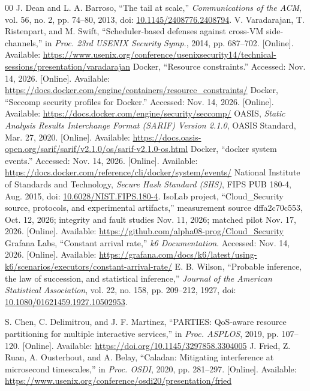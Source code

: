\documentclass[conference,letterpaper]{IEEEtran}
\begin{document}
\begin{thebibliography}{00}
 J. Dean and L. A. Barroso, ``The tail at scale,'' \emph{Communications of the ACM}, vol. 56, no. 2, pp. 74--80, 2013, doi: \href{https://doi.org/10.1145/2408776.2408794}{10.1145/2408776.2408794}.
 V. Varadarajan, T. Ristenpart, and M. Swift, ``Scheduler-based defenses against cross-VM side-channels,'' in \emph{Proc. 23rd USENIX Security Symp.}, 2014, pp. 687--702. [Online]. Available: \url{https://www.usenix.org/conference/usenixsecurity14/technical-sessions/presentation/varadarajan}
 Docker, ``Resource constraints.'' Accessed: Nov. 14, 2026. [Online]. Available: \url{https://docs.docker.com/engine/containers/resource_constraints/}
 Docker, ``Seccomp security profiles for Docker.'' Accessed: Nov. 14, 2026. [Online]. Available: \url{https://docs.docker.com/engine/security/seccomp/}
 OASIS, \emph{Static Analysis Results Interchange Format (SARIF) Version 2.1.0}, OASIS Standard, Mar. 27, 2020. [Online]. Available: \url{https://docs.oasis-open.org/sarif/sarif/v2.1.0/os/sarif-v2.1.0-os.html}
 Docker, ``docker system events.'' Accessed: Nov. 14, 2026. [Online]. Available: \url{https://docs.docker.com/reference/cli/docker/system/events/}
 National Institute of Standards and Technology, \emph{Secure Hash Standard (SHS)}, FIPS PUB 180-4, Aug. 2015, doi: \href{https://doi.org/10.6028/NIST.FIPS.180-4}{10.6028/NIST.FIPS.180-4}.
 IsoLab project, ``Cloud\_Security source, protocols, and experimental artifacts,'' measurement source dffa2c70c553, Oct. 12, 2026; integrity and fault studies Nov. 11, 2026; matched pilot Nov. 17, 2026. [Online]. Available: \url{https://github.com/alpha08-prog/Cloud_Security}
 Grafana Labs, ``Constant arrival rate,'' \emph{k6 Documentation}. Accessed: Nov. 14, 2026. [Online]. Available: \url{https://grafana.com/docs/k6/latest/using-k6/scenarios/executors/constant-arrival-rate/}
 E. B. Wilson, ``Probable inference, the law of succession, and statistical inference,'' \emph{Journal of the American Statistical Association}, vol. 22, no. 158, pp. 209--212, 1927, doi: \href{https://doi.org/10.1080/01621459.1927.10502953}{10.1080/01621459.1927.10502953}.

 S. Chen, C. Delimitrou, and J. F. Martinez, ``PARTIES: QoS-aware resource partitioning for multiple interactive services,'' in \emph{Proc. ASPLOS}, 2019, pp. 107--120. [Online]. Available: \url{https://doi.org/10.1145/3297858.3304005}
 J. Fried, Z. Ruan, A. Ousterhout, and A. Belay, ``Caladan: Mitigating interference at microsecond timescales,'' in \emph{Proc. OSDI}, 2020, pp. 281--297. [Online]. Available: \url{https://www.usenix.org/conference/osdi20/presentation/fried}

\end{thebibliography}
\end{document}
